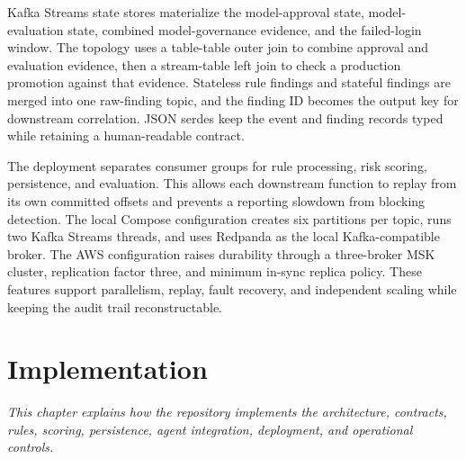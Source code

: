 \documentclass[12pt,oneside]{report}
\begin{document}
Kafka Streams state stores materialize the model-approval state, model-evaluation state, combined model-governance evidence, and the failed-login window. The topology uses a table-table outer join to combine approval and evaluation evidence, then a stream-table left join to check a production promotion against that evidence. Stateless rule findings and stateful findings are merged into one raw-finding topic, and the finding ID becomes the output key for downstream correlation. JSON serdes keep the event and finding records typed while retaining a human-readable contract.

The deployment separates consumer groups for rule processing, risk scoring, persistence, and evaluation. This allows each downstream function to replay from its own committed offsets and prevents a reporting slowdown from blocking detection. The local Compose configuration creates six partitions per topic, runs two Kafka Streams threads, and uses Redpanda as the local Kafka-compatible broker. The AWS configuration raises durability through a three-broker MSK cluster, replication factor three, and minimum in-sync replica policy. These features support parallelism, replay, fault recovery, and independent scaling while keeping the audit trail reconstructable.
\chapter{Implementation}
\noindent\textit{This chapter explains how the repository implements the architecture, contracts, rules, scoring, persistence, agent integration, deployment, and operational controls.}\par
\end{document}
